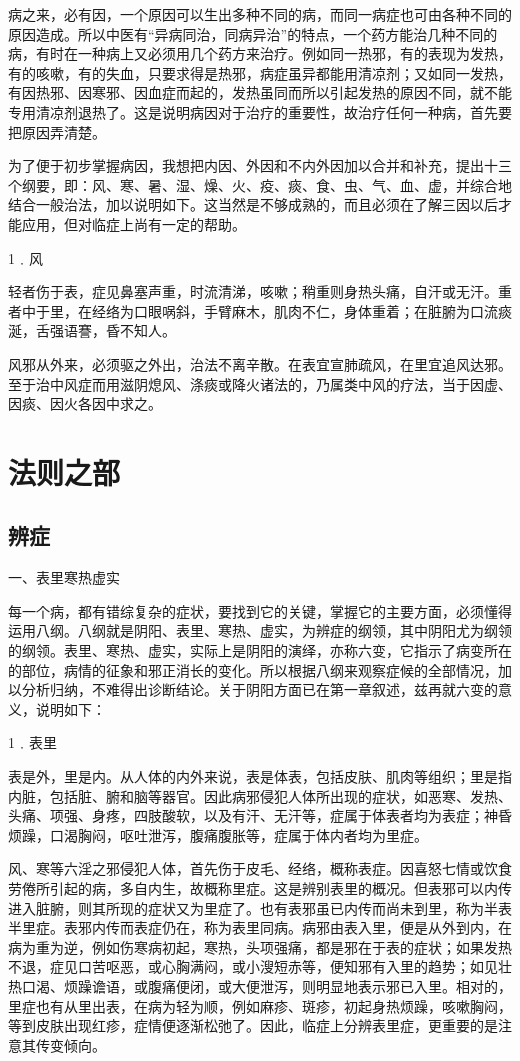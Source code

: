 \documentclass[12pt,UTF8]{ctexbook}
\begin{document}
病之来，必有因，一个原因可以生出多种不同的病，而同一病症也可由各种不同的原因造成。所以中医有“异病同治，同病异治”的特点，一个药方能治几种不同的病，有时在一种病上又必须用几个药方来治疗。例如同一热邪，有的表现为发热，有的咳嗽，有的失血，只要求得是热邪，病症虽异都能用清凉剂；又如同一发热，有因热邪、因寒邪、因血症而起的，发热虽同而所以引起发热的原因不同，就不能专用清凉剂退热了。这是说明病因对于治疗的重要性，故治疗任何一种病，首先要把原因弄清楚。

为了便于初步掌握病因，我想把内因、外因和不内外因加以合并和补充，提出十三个纲要，即：风、寒、暑、湿、燥、火、疫、痰、食、虫、气、血、虚，并综合地结合一般治法，加以说明如下。这当然是不够成熟的，而且必须在了解三因以后才能应用，但对临症上尚有一定的帮助。

1﹒风

轻者伤于表，症见鼻塞声重，时流清涕，咳嗽；稍重则身热头痛，自汗或无汗。重者中于里，在经络为口眼㖞斜，手臂麻木，肌肉不仁，身体重着；在脏腑为口流痰涎，舌强语謇，昏不知人。

风邪从外来，必须驱之外出，治法不离辛散。在表宜宣肺疏风，在里宜追风达邪。至于治中风症而用滋阴熄风、涤痰或降火诸法的，乃属类中风的疗法，当于因虚、因痰、因火各因中求之。

\chapter{法则之部}

\section{辨症}

一、表里寒热虚实

每一个病，都有错综复杂的症状，要找到它的关键，掌握它的主要方面，必须懂得运用八纲。八纲就是阴阳、表里、寒热、虚实，为辨症的纲领，其中阴阳尤为纲领的纲领。表里、寒热、虚实，实际上是阴阳的演绎，亦称六变，它指示了病变所在的部位，病情的征象和邪正消长的变化。所以根据八纲来观察症候的全部情况，加以分析归纳，不难得出诊断结论。关于阴阳方面已在第一章叙述，兹再就六变的意义，说明如下：

1﹒表里

表是外，里是内。从人体的内外来说，表是体表，包括皮肤、肌肉等组织；里是指内脏，包括脏、腑和脑等器官。因此病邪侵犯人体所出现的症状，如恶寒、发热、头痛、项强、身疼，四肢酸软，以及有汗、无汗等，症属于体表者均为表症；神昏烦躁，口渴胸闷，呕吐泄泻，腹痛腹胀等，症属于体内者均为里症。

风、寒等六淫之邪侵犯人体，首先伤于皮毛、经络，概称表症。因喜怒七情或饮食劳倦所引起的病，多自内生，故概称里症。这是辨别表里的概况。但表邪可以内传进入脏腑，则其所现的症状又为里症了。也有表邪虽已内传而尚未到里，称为半表半里症。表邪内传而表症仍在，称为表里同病。病邪由表入里，便是从外到内，在病为重为逆，例如伤寒病初起，寒热，头项强痛，都是邪在于表的症状；如果发热不退，症见口苦呕恶，或心胸满闷，或小溲短赤等，便知邪有入里的趋势；如见壮热口渴、烦躁谵语，或腹痛便闭，或大便泄泻，则明显地表示邪已入里。相对的，里症也有从里出表，在病为轻为顺，例如麻疹、斑疹，初起身热烦躁，咳嗽胸闷，等到皮肤出现红疹，症情便逐渐松弛了。因此，临症上分辨表里症，更重要的是注意其传变倾向。
\end{document}
